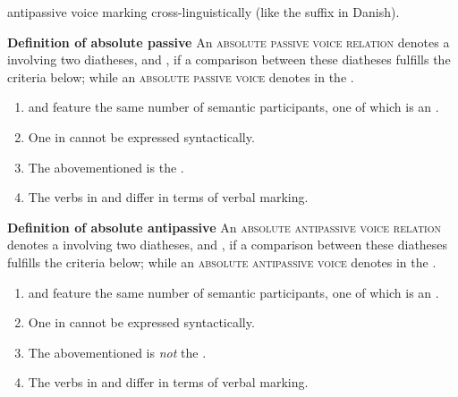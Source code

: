 antipassive voice marking cross-linguistically (like the suffix  in Danish). 

\eanoraggedright
		\textbf{Definition of absolute passive} \newline
		An \textsc{absolute passive voice relation} denotes a  involving two diatheses,  and , if a comparison between these diatheses fulfills the criteria below; while an \textsc{absolute passive voice} denotes  in the .
		\begin{enumerate}[label=\roman*)]
			\item {} and  feature the same number of semantic participants, one of which is an .
			\item One  in  cannot be expressed syntactically.
			\item The abovementioned  is the .
			\item The verbs in  and  differ in terms of verbal marking.
		\end{enumerate}
\z

\eanoraggedright
		\textbf{Definition of absolute antipassive} \newline
		An \textsc{absolute antipassive voice relation} denotes a  involving two diatheses,  and , if a comparison between these diatheses fulfills the criteria below; while an \textsc{absolute antipassive voice} denotes  in the .
		\begin{enumerate}[label=\roman*)]
			\item {} and  feature the same number of semantic participants, one of which is an .
			\item One  in  cannot be expressed syntactically.
			\item The abovementioned  is \textit{not} the .
			\item The verbs in  and  differ in terms of verbal marking.
		\end{enumerate}
	\z
\smallskip

